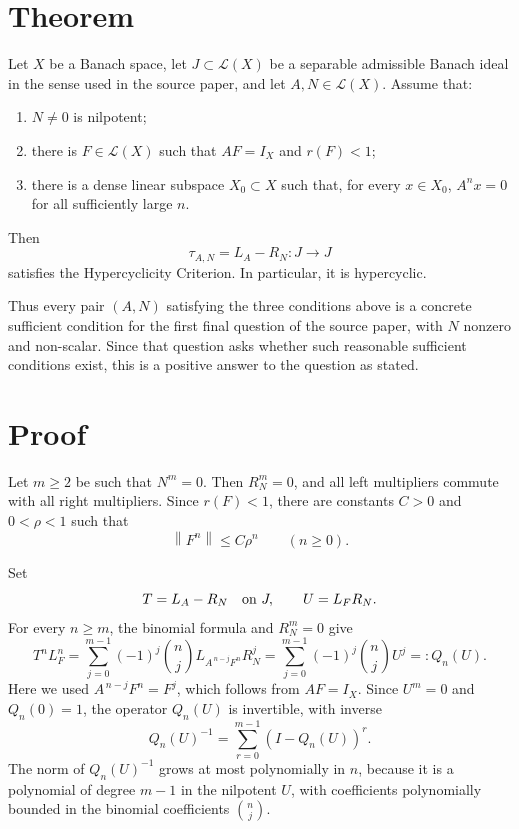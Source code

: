 \documentclass[11pt]{article}
\newcommand{\LL}{\mathcal L}
\newcommand{\J}{J}
\newcommand{\norm}[1]{\left\lVert #1 \right\rVert}
\begin{document}
\section*{Theorem}

Let \(X\) be a Banach space, let \(\J\subset \LL(X)\) be a separable admissible
Banach ideal in the sense used in the source paper, and let \(A,N\in\LL(X)\).
Assume that:
\begin{enumerate}
\item \(N\neq 0\) is nilpotent;
\item there is \(F\in\LL(X)\) such that \(AF=I_X\) and \(r(F)<1\);
\item there is a dense linear subspace \(X_0\subset X\) such that, for every
  \(x\in X_0\), \(A^n x=0\) for all sufficiently large \(n\).
\end{enumerate}
Then
\[
  \tau_{A,N}=L_A-R_N:\J\to\J
\]
satisfies the Hypercyclicity Criterion.  In particular, it is hypercyclic.

Thus every pair \((A,N)\) satisfying the three conditions above is a concrete
sufficient condition for the first final question of the source paper, with
\(N\) nonzero and non-scalar.  Since that question asks whether such reasonable
sufficient conditions exist, this is a positive answer to the question as
stated.

\section*{Proof}

Let \(m\geq 2\) be such that \(N^m=0\).  Then \(R_N^m=0\), and all left
multipliers commute with all right multipliers.  Since \(r(F)<1\), there are
constants \(C>0\) and \(0<\rho<1\) such that
\[
  \norm{F^n}\leq C\rho^n\qquad(n\geq 0).
\]

Set
\[
  T=L_A-R_N \quad\hbox{on }\J,
  \qquad U=L_F R_N .
\]
For every \(n\geq m\), the binomial formula and \(R_N^m=0\) give
\[
  T^n L_F^n
   = \sum_{j=0}^{m-1}(-1)^j \binom{n}{j}
        L_{A^{\,n-j}F^n} R_N^j
   = \sum_{j=0}^{m-1}(-1)^j \binom{n}{j} U^j
   =: Q_n(U).
\]
Here we used \(A^{\,n-j}F^n=F^j\), which follows from \(AF=I_X\).  Since
\(U^m=0\) and \(Q_n(0)=1\),
the operator \(Q_n(U)\) is invertible, with inverse
\[
  Q_n(U)^{-1}
  = \sum_{r=0}^{m-1}\left(I-Q_n(U)\right)^r .
\]
The norm of \(Q_n(U)^{-1}\) grows at most polynomially in \(n\), because it is
a polynomial of degree \(m-1\) in the nilpotent \(U\), with coefficients
polynomially bounded in the binomial coefficients \(\binom{n}{j}\).
\end{document}
